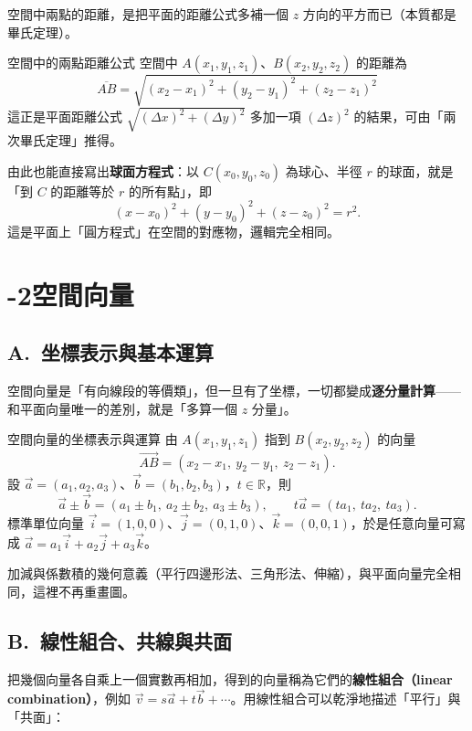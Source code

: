 \documentclass[11pt]{article}
\begin{document}

空間中兩點的距離，是把平面的距離公式多補一個 $z$ 方向的平方而已（本質都是畢氏定理）。

\begin{補充框}{空間中的兩點距離公式}
空間中 $A(x_1,y_1,z_1)$、$B(x_2,y_2,z_2)$ 的距離為
$$\boxed{\;\overline{AB}=\sqrt{(x_2-x_1)^2+(y_2-y_1)^2+(z_2-z_1)^2}\;}$$
這正是平面距離公式 $\sqrt{(\Delta x)^2+(\Delta y)^2}$ 多加一項 $(\Delta z)^2$ 的結果，可由「兩次畢氏定理」推得。

由此也能直接寫出\textbf{球面方程式}：以 $C(x_0,y_0,z_0)$ 為球心、半徑 $r$ 的球面，就是「到 $C$ 的距離等於 $r$ 的所有點」，即
$$(x-x_0)^2+(y-y_0)^2+(z-z_0)^2=r^2.$$
這是平面上「圓方程式」在空間的對應物，邏輯完全相同。
\end{補充框}

\section*{-2\quad 空間向量}

\subsection*{\sffamily A.\ 坐標表示與基本運算}

空間向量是「有向線段的等價類」，但一旦有了坐標，一切都變成\textbf{逐分量計算}——和平面向量唯一的差別，就是「多算一個 $z$ 分量」。

\begin{補充框}{空間向量的坐標表示與運算}
由 $A(x_1,y_1,z_1)$ 指到 $B(x_2,y_2,z_2)$ 的向量
$$\vec{AB}=(x_2-x_1,\ y_2-y_1,\ z_2-z_1).$$
設 $\vec a=(a_1,a_2,a_3)$、$\vec b=(b_1,b_2,b_3)$，$t\in\mathbb{R}$，則
$$\vec a\pm\vec b=(a_1\pm b_1,\ a_2\pm b_2,\ a_3\pm b_3),\qquad t\vec a=(ta_1,\ ta_2,\ ta_3).$$
標準單位向量 $\vec i=(1,0,0)$、$\vec j=(0,1,0)$、$\vec k=(0,0,1)$，於是任意向量可寫成 $\vec a=a_1\vec i+a_2\vec j+a_3\vec k$。
\end{補充框}

加減與係數積的幾何意義（平行四邊形法、三角形法、伸縮），與平面向量完全相同，這裡不再重畫圖。

\subsection*{\sffamily B.\ 線性組合、共線與共面}

把幾個向量各自乘上一個實數再相加，得到的向量稱為它們的\textbf{線性組合（linear combination）}，例如 $\vec v=s\vec a+t\vec b+\cdots$。用線性組合可以乾淨地描述「平行」與「共面」：
\end{document}
